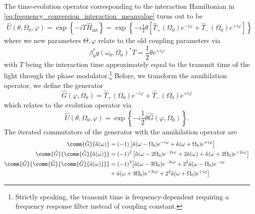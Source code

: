 The time-evolution operator corresponding to the interaction Hamiltonian in \cref{eq:frequency_conversion_interaction_meanvalue} turns out to be
\begin{equation}
	\begin{split}
		\hat{U}(\theta,\Omega_0,\varphi)
		=
		\exp\left\{
			-iT
			\hat{H}_\text{int}
		\right\}
		=
		\exp\left\{
			-i
			\frac{1}{2}
			\theta
			\left[
				\hat{T}_+(\Omega_0)
				e^{-i\varphi}
				+
				\hat{T}_-(\Omega_0)
				e^{+i\varphi}
			\right]
		\right\}
	\end{split}
	\label{eq:frequency_conversion_evolution}
\end{equation}
where we new parameters $\Theta,\varphi$ relate to the old coupling parameters via
\begin{equation}
	\beta_0^*
	g(\omega_0,\Omega_0)^*
	T
	=
	\frac{1}{2}
	\theta
	e^{+i\varphi}
\end{equation}
with $T$ being the interaction time approximately equal to the transmit time of the light through the phase modulator.\footnote{Strictly speaking, the transmit time is frequency-dependent requiring a frequency response filter instead of coupling constant.}
Before, we transform the annihilation operator, we define the generator
\begin{equation}
	\hat{G}(\varphi,\Omega_0)
	=
	\hat{T}_+(\Omega_0)
	e^{-i\varphi}
	+
	\hat{T}_-(\Omega_0)
	e^{+i\varphi}
	\label{eq:frequency_conversion_generator}
\end{equation}
which relates to the evolution operator via
\begin{equation}
	\hat{U}(\theta,\Omega_0,\varphi)
	=
	\exp\left\{
		-i\frac{1}{2}
		\theta
		\hat{G}(\varphi,\Omega_0)
	\right\}
	.
\end{equation}
The iterated commutators of the generator with the annihilation operator are
\begin{align}
	\comm{\hat{G}}{\hat{a}(\omega)}
	&=
	(-1)
	\left[
		\hat{a}(\omega-\Omega_0)
		e^{-i\varphi}
		+
		\hat{a}(\omega+\Omega_0)
		e^{+i\varphi}
	\right]
	\\
	\comm{\hat{G}}{\comm{\hat{G}}{\hat{a}(\omega)}}
	&=
	(-1)^2
	\left[
		\hat{a}(\omega-2\Omega_0)
		e^{-2i\varphi}
		+
		2\hat{a}(\omega)
		+
		\hat{a}(\omega+2\Omega_0)
		e^{+2i\varphi}
	\right]
	\\
	\comm{\hat{G}}{\comm{\hat{G}}{\comm{\hat{G}}{\hat{a}(\omega)}}}
	&=
	(-1)^3
	\bigl[
	\hat{a}(\omega-3\Omega_0)
	e^{-3i\varphi}
	+
	2^2
	\hat{a}(\omega-\Omega_0)
	e^{-i\varphi}
	\\
	&+
	\hat{a}(\omega+3\Omega_0)
	e^{+3i\varphi}
	+
	2^2
	\hat{a}(\omega+\Omega_0)
	e^{+i\varphi}
	\bigr]
\end{align}
